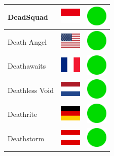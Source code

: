 \documentclass[12pt, a4paper, twoside]{report}
\begin{document}
\begin{center}
\begin{longtable}{|p{5cm}|p{2cm}|p{2cm}|}
 DeadSquad                                                  & \includegraphics[width=1cm]{../img/flags/id} &   \includegraphics[width=1cm]{../likes/y} \\ \hline
 Death Angel                                                & \includegraphics[width=1cm]{../img/flags/us} &   \includegraphics[width=1cm]{../likes/y} \\ \hline
 Deathawaits                                                & \includegraphics[width=1cm]{../img/flags/fr} &   \includegraphics[width=1cm]{../likes/y} \\ \hline
 Deathless Void                                             & \includegraphics[width=1cm]{../img/flags/nl} &   \includegraphics[width=1cm]{../likes/y} \\ \hline
 Deathrite                                                  & \includegraphics[width=1cm]{../img/flags/de} &   \includegraphics[width=1cm]{../likes/y} \\ \hline
 Deathstorm                                                 & \includegraphics[width=1cm]{../img/flags/at} &   \includegraphics[width=1cm]{../likes/y} \\ \hline

\end{longtable}
\end{center}
\end{document}
